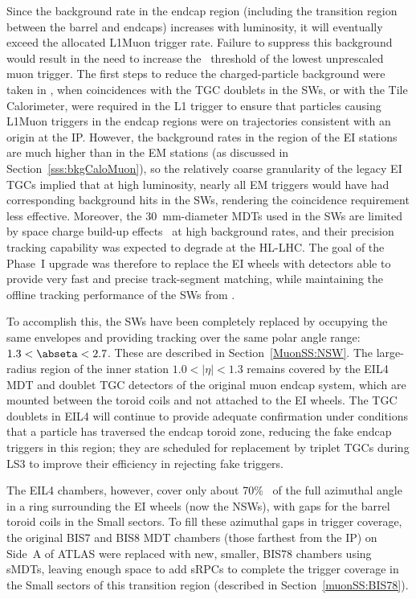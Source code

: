 \documentclass[cernpreprint, atlasdraft=false, UKenglish,british,orcidlogo, texmf, orcidlogo]{atlasdoc}
\begin{document}
Since the background rate in the endcap region (including the transition region between the barrel and endcaps) increases with luminosity, it will eventually exceed the allocated \gls{L1Muon} trigger rate.
Failure to suppress this background would result in the need to increase the \pT\ threshold of the lowest unprescaled muon trigger.
The first steps to reduce the charged-particle background were taken in \RunTwo, when coincidences with the \gls{TGC} doublets in the \glspl{SW}, or with the Tile Calorimeter, were required in the \gls{L1} trigger to ensure that particles causing \gls{L1Muon} triggers in the endcap regions were on trajectories consistent with an origin at the \gls{IP}.
However, the background rates in the region of the EI stations are much higher than in the EM stations (as discussed in Section~\ref{sss:bkgCaloMuon}), so the relatively coarse granularity of the legacy EI
\glspl{TGC} implied that at high luminosity, nearly all EM triggers would have had corresponding background hits in the \glspl{SW}, rendering the coincidence requirement less effective.
Moreover, the \SI{30}{mm}-diameter \glspl{MDT} used in the \glspl{SW} are limited by space charge build-up effects~\cite{4436512} at high background rates, and their precision tracking capability was expected to degrade at the \gls{HL-LHC}.
The goal of the Phase~I upgrade was therefore to replace the EI wheels with detectors able to provide very fast and precise track-segment matching, while maintaining the offline tracking performance of the \glspl{SW} from \RunOneTwo.
 
To accomplish this, the \glspl{SW} have been completely replaced by  occupying the same envelopes and providing tracking over the same polar angle range: $1.3 < \abseta < 2.7$. These are described in Section~\ref{MuonSS:NSW}.
The large-radius region of the inner station
$1.0 < |\eta| < 1.3$ remains covered by the \gls{EIL4} \gls{MDT} and doublet \gls{TGC} detectors of the
original muon endcap system, which are mounted between the toroid coils and not attached to the EI wheels. The \gls{TGC} doublets in \gls{EIL4} will continue to provide adequate confirmation under \RunThr conditions that a particle has traversed the endcap
toroid zone, reducing the fake endcap triggers in this region; they are scheduled for replacement by triplet \glspl{TGC} during \gls{LS3} to improve their efficiency in rejecting fake triggers.
 
The
\gls{EIL4} chambers, however, cover only about 70\%~\cite{ATLAS-TDR-26} of the full azimuthal
angle in a ring surrounding the EI wheels (now the \glspl{NSW}), with gaps for the barrel toroid coils in the Small sectors.
To fill these azimuthal gaps in trigger coverage, the original BIS7 and BIS8 \gls{MDT} chambers (those farthest from the \gls{IP}) on Side~A of ATLAS were replaced with new, smaller, \gls{BIS78} chambers using
\glspl{sMDT}, leaving enough space to add \glspl{sRPC}
to complete the trigger coverage in the Small sectors of this transition region (described in Section~\ref{muonSS:BIS78}).
 
\end{document}
